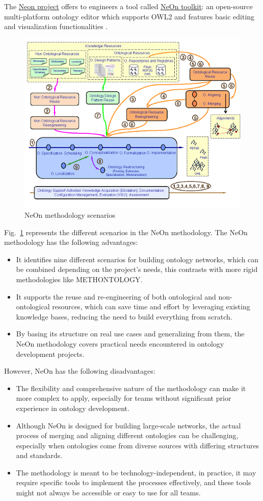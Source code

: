 The \href{http://neon-project.org/nw/Welcome_to_the_NeOn_Project.html}{Neon project} offers to engineers a tool called \href{http://neon-toolkit.org/wiki/Main_Page.html}{NeOn toolkit}: an open-source multi-platform ontology editor which supports OWL2 and features basic editing and visualization functionalities \cite{erdmann2011overview}.

\begin{figure}[H]
    \centering
    \includegraphics[width=0.5\linewidth]{Figures/fig_2.png}
    \caption{NeOn methodology scenarios}
    \label{fig:2}
\end{figure}
Fig.~\ref{fig:2} represents the different scenarios in the NeOn methodology.
The NeOn methodology has the following advantages:
\begin{itemize}
    \item It identifies nine different scenarios for building ontology networks, which can be combined depending on the project’s needs, this contrasts with more rigid methodologies like METHONTOLOGY.

    \item It supports the reuse and re-engineering of both ontological and non-ontological resources, which can save time and effort by leveraging existing knowledge bases, reducing the need to build everything from scratch.

    \item By basing its structure on real use cases and generalizing from them, the NeOn methodology covers practical needs encountered in ontology development projects.
\end{itemize}
However, NeOn has the following disadvantages:
\begin{itemize}
    \item The flexibility and comprehensive nature of the methodology can make it more complex to apply, especially for teams without significant prior experience in ontology development. 

    \item Although NeOn is designed for building large-scale networks, the actual process of merging and aligning different ontologies can be challenging, especially when ontologies come from diverse sources with differing structures and standards.

    \item The methodology is meant to be technology-independent, in practice, it may require specific tools to implement the processes effectively, and these tools might not always be accessible or easy to use for all teams.
\end{itemize}

